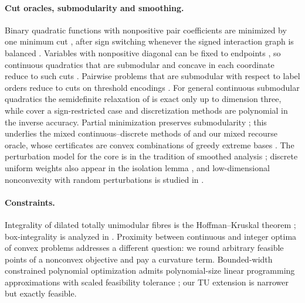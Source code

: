 \paragraph{Cut oracles, submodularity and smoothing.}
Binary quadratic functions with nonpositive pair coefficients are minimized by one minimum cut
\cite{Ivanescu1965,PicardRatliff1975,BorosHammer2002,KolmogorovZabih2004}, after sign switching
whenever the signed interaction graph is balanced \cite{Harary1953,HammerHansenSimeone1984,
Padberg1989}. Variables with nonpositive diagonal can be fixed to endpoints
\cite{Rosenberg1972,DelPiaKhajavirad2026,Khajavirad2026PolyBox}, so continuous quadratics that
are submodular and concave in each coordinate reduce to such cuts
\cite{BurerNatarajanWillemsen2026v3}. Pairwise problems that are submodular with respect to label
orders reduce to cuts on threshold encodings \cite{SchlesingerFlach2006,Ishikawa2003,Hochbaum2001}.
For general continuous submodular quadratics the semidefinite relaxation of
\cite{BurerNatarajanWillemsen2026v3} is exact only up to dimension three, while
\cite{KimKojima2003} cover a sign-restricted case and discretization methods
\cite{Bach2019,Bach2018Isotonic,AxelrodLiuSidford2020} are polynomial in the inverse accuracy.
Partial minimization preserves submodularity \cite{Topkis1978,Topkis1998}; this underlies the
mixed continuous--discrete methods of \cite{GomezHan2025,BuntonTabuada2022} and our mixed
recourse oracle, whose certificates are convex combinations of greedy extreme bases
\cite{Edmonds1970,Cunningham1985,IwataFleischerFujishige2001,Schrijver2000}. The perturbation
model for the core is in the tradition of smoothed analysis
\cite{SpielmanTeng2004,BeierVocking2006,RoglinVocking2007}; discrete uniform weights also appear in
the isolation lemma \cite{MulmuleyVaziraniVazirani1987}, and low-dimensional nonconvexity with
random perturbations is studied in \cite{KelnerNikolova2007}.

\paragraph{Constraints.}
Integrality of dilated totally unimodular fibres is the Hoffman--Kruskal theorem
\cite{HoffmanKruskal1956,Schrijver1986}; box-integrality is analyzed in
\cite{ChervetGrappeRobert2021}. Proximity between continuous and integer optima of convex
problems \cite{CookGerardsSchrijverTardos1986,GranotSkorinKapov1990,HochbaumShanthikumar1990}
addresses a different question: we round arbitrary feasible points of a nonconvex objective and
pay a curvature term. Bounded-width constrained polynomial optimization admits polynomial-size
linear programming approximations with scaled feasibility tolerance \cite{BienstockMunoz2018};
our TU extension is narrower but exactly feasible.

